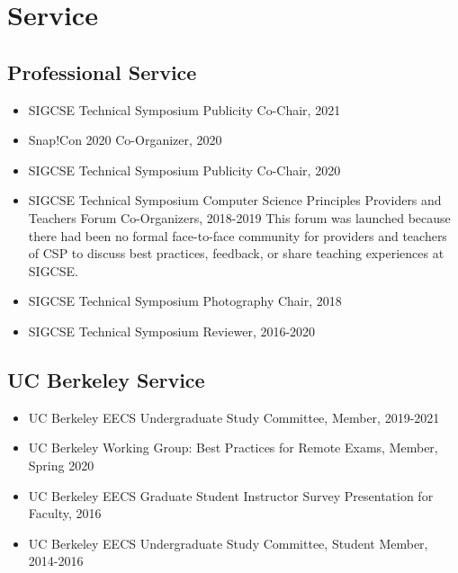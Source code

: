 \section{Service}

\vspace{6pt}

\subsection{Professional Service}

\vspace{5pt}

\begin{itemize}
 
  \setlength\itemsep{1em}
    \item{SIGCSE Technical Symposium Publicity Co-Chair, 2021}

    \item{Snap!Con 2020 Co-Organizer, 2020}
    
    \item{SIGCSE Technical Symposium Publicity Co-Chair, 2020}

    \item SIGCSE Technical Symposium Computer Science Principles Providers and Teachers Forum Co-Organizers, 2018-2019
    \newline
    \small This forum was launched because there had been no formal face-to-face community for providers and teachers of CSP to discuss best practices, feedback, or share teaching experiences at SIGCSE.
    
    \item{SIGCSE Technical Symposium Photography Chair, 2018}
    
    \item{SIGCSE Technical Symposium Reviewer, 2016-2020}
    
\end{itemize}

\vspace{10pt}

\subsection{UC Berkeley Service}

\vspace{6pt}

\begin{itemize}

  \setlength\itemsep{1em}

    \item{UC Berkeley EECS Undergraduate Study Committee, Member, 2019-2021}
    
    \item{UC Berkeley Working Group: Best Practices for Remote Exams, Member, Spring 2020}
    
    \item{UC Berkeley EECS Graduate Student Instructor Survey Presentation for Faculty, 2016}
   
    \item{UC Berkeley EECS Undergraduate Study Committee, Student Member, 2014-2016}
   
\end{itemize}

\vspace{3pt}

